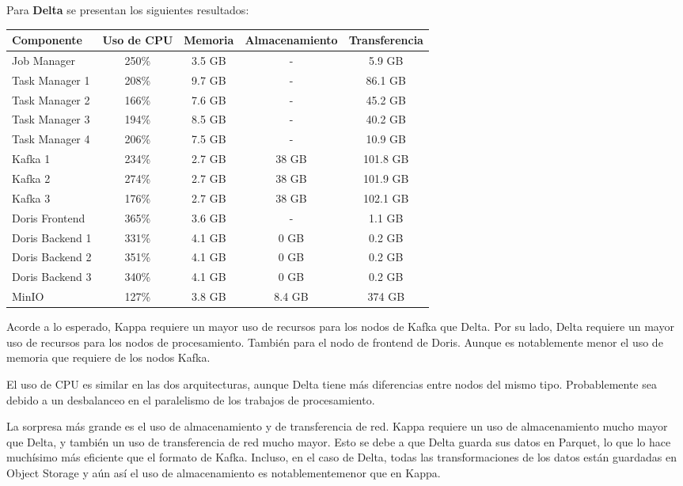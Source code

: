 \newpage

Para \textbf{Delta} se presentan los siguientes resultados:

\begin{longtable}{|p{3cm}|c|c|c|c|}
    \hline
    \textbf{Componente} & \textbf{Uso de CPU} & \textbf{Memoria} & \textbf{Almacenamiento} & \textbf{Transferencia} \\
    \hline
    Job Manager & 250\% & 3.5 GB & - & 5.9 GB \\
    \hline
    Task Manager 1 & 208\% & 9.7 GB & - & 86.1 GB \\
    \hline
    Task Manager 2 & 166\% & 7.6 GB & - & 45.2 GB \\
    \hline
    Task Manager 3 & 194\% & 8.5 GB & - & 40.2 GB \\
    \hline
    Task Manager 4 & 206\% & 7.5 GB & - & 10.9 GB \\
    \hline
    Kafka 1 & 234\% & 2.7 GB & 38 GB & 101.8 GB \\
    \hline
    Kafka 2 & 274\% & 2.7 GB & 38 GB & 101.9 GB \\
    \hline
    Kafka 3 & 176\% & 2.7 GB & 38 GB & 102.1 GB \\
    \hline
    Doris Frontend & 365\% & 3.6 GB & - & 1.1 GB \\
    \hline
    Doris Backend 1 & 331\% & 4.1 GB & 0 GB & 0.2 GB \\
    \hline
    Doris Backend 2 & 351\% & 4.1 GB & 0 GB & 0.2 GB \\
    \hline
    Doris Backend 3 & 340\% & 4.1 GB & 0 GB & 0.2 GB \\
    \hline 
    MinIO & 127\% & 3.8 GB & 8.4 GB & 374 GB \\
    \hline
\end{longtable}

\newpage

Acorde a lo esperado, Kappa requiere un mayor uso de recursos para los nodos de Kafka que Delta.
Por su lado, Delta requiere un mayor uso de recursos para los nodos de procesamiento. También para el nodo de frontend de Doris. 
Aunque es notablemente menor el uso de memoria que requiere de los nodos Kafka. \newline

El uso de CPU es similar en las dos arquitecturas, aunque Delta tiene más diferencias entre nodos del mismo tipo. 
Probablemente sea debido a un desbalanceo en el paralelismo de los trabajos de procesamiento. \newline 

La sorpresa más grande es el uso de almacenamiento y de transferencia de red. 
Kappa requiere un uso de almacenamiento mucho mayor que Delta, y también un uso de transferencia de red mucho mayor.
Esto se debe a que Delta guarda sus datos en Parquet, lo que lo hace muchísimo más eficiente que el formato de Kafka.
Incluso, en el caso de Delta, todas las transformaciones de los datos están guardadas en Object Storage 
y aún así el uso de almacenamiento es notablementemenor que en Kappa. 


